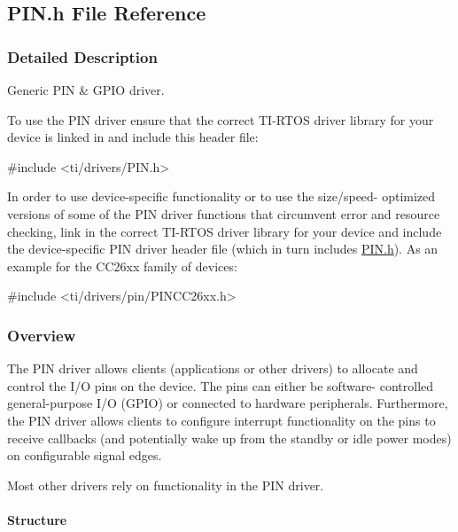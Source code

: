 \subsection{P\+I\+N.\+h File Reference}
\label{_p_i_n_8h}


\subsubsection{Detailed Description}
Generic P\+I\+N \& G\+P\+I\+O driver. 





To use the P\+I\+N driver ensure that the correct T\+I-\/\+R\+T\+O\+S driver library for your device is linked in and include this header file\+: 
\begin{DoxyCode}
\textcolor{preprocessor}{#include <ti/drivers/PIN.h>}
\end{DoxyCode}


In order to use device-\/specific functionality or to use the size/speed-\/ optimized versions of some of the P\+I\+N driver functions that circumvent error and resource checking, link in the correct T\+I-\/\+R\+T\+O\+S driver library for your device and include the device-\/specific P\+I\+N driver header file (which in turn includes \hyperlink{_p_i_n_8h}{P\+I\+N.\+h}). As an example for the C\+C26xx family of devices\+: 
\begin{DoxyCode}
\textcolor{preprocessor}{#include <ti/drivers/pin/PINCC26xx.h>}
\end{DoxyCode}


\subsubsection*{Overview}

The P\+I\+N driver allows clients (applications or other drivers) to allocate and control the I/\+O pins on the device. The pins can either be software-\/ controlled general-\/purpose I/\+O (G\+P\+I\+O) or connected to hardware peripherals. Furthermore, the P\+I\+N driver allows clients to configure interrupt functionality on the pins to receive callbacks (and potentially wake up from the standby or idle power modes) on configurable signal edges.

Most other drivers rely on functionality in the P\+I\+N driver.

\paragraph*{Structure}


